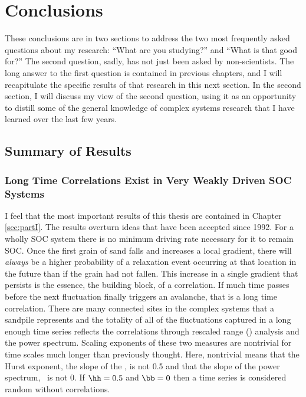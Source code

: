 \chapter{Conclusions}
\label{sec:conclusions}

These conclusions are in two sections to address the two most
frequently asked questions about my research: ``What are you
studying?'' and ``What is that good for?''  The second question,
sadly, has not just been asked by non-scientists.  The long answer to
the first question is contained in previous chapters, and I will
recapitulate the specific results of that research in this next
section.  In the second section, I will discuss my view of the second
question, using it as an opportunity to distill some of the general
knowledge of complex systems research that I have learned over the
last few years.

\section{Summary of Results}
\label{sec:summary-results}

\subsection{Long Time Correlations Exist in Very Weakly
  Driven SOC Systems}
\label{sec:long-time-corr}

I feel that the most important results of this thesis are contained in
Chapter \ref{sec:partI}.  The results overturn ideas that have been
accepted since 1992.  For a wholly SOC system there is no minimum
driving rate necessary for it to remain SOC.  Once the first grain of
sand falls and increases a local gradient, there will {\em always} be
a higher probability of a relaxation event occurring at that location
in the future than if the grain had not fallen.  This increase in a
single gradient that persists is the essence, the building block, of a
correlation.  If much time passes before the next fluctuation finally
triggers an avalanche, that is a long time correlation.  There are
many connected sites in the complex systems that a sandpile represents
and the totality of all of the fluctuations captured in a long enough
time series reflects the correlations through rescaled range (\rs)
analysis and the power spectrum.  Scaling exponents of these two
measures are nontrivial for time scales much longer than previously
thought.  Here, nontrivial means that the Hurst exponent, the slope of
the \rsa, is not 0.5 and that the slope of the power spectrum, \bb\,
is not 0.  If $\hh = 0.5$ and $\bb = 0$ then a time series is
considered random without correlations.

